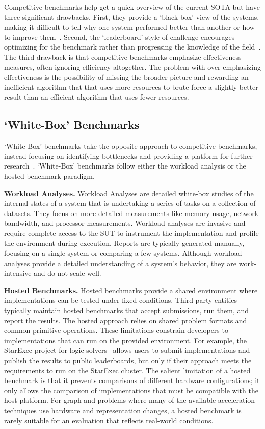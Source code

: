 Competitive benchmarks help get a quick overview of the current \ac{SOTA} but have three significant drawbacks. 
First, they provide a `black box' view of the systems, making it difficult to tell why one system performed better than another or how to improve them~\cite{Saavedra1996, Hooker1994}.
Second, the `leaderboard' style of challenge encourages optimizing for the benchmark rather than progressing the knowledge of the field~\cite{Hooker1995}. 
The third drawback is that competitive benchmarks emphasize effectiveness measures, often ignoring efficiency altogether.
The problem with over-emphasizing effectiveness is the possibility of missing the broader picture and rewarding an inefficient algorithm that that uses more resources to brute-force a slightly better result than an efficient algorithm that uses fewer resources.

\subsection{`White-Box' Benchmarks}
`White-Box' benchmarks take the opposite approach to competitive benchmarks, instead focusing on identifying bottlenecks and providing a platform for further research~\cite{Hooker1994, Hooker1995}.
`White-Box' benchmarks follow either the workload analysis or the hosted benchmark paradigm.

\textbf{Workload Analyses.}
Workload Analyses are detailed white-box studies of the internal states of a system that is undertaking a series of tasks on a collection of datasets.
They focus on more detailed measurements like memory usage, network bandwidth, and processor measurements.
Workload analyses are invasive and require complete access to the \ac{SUT} to instrument the implementation and profile the environment during execution.
Reports are typically generated manually, focusing on a single system or comparing a few systems. 
Although workload analyses provide a detailed understanding of a system's behavior, they are work-intensive and do not scale well.

\textbf{Hosted Benchmarks.}
Hosted benchmarks provide a shared environment where implementations can be tested under fixed conditions.
Third-party entities typically maintain hosted benchmarks that accept submissions, run them, and report the results. 
The hosted approach relies on shared problem formats and common primitive operations. 
These limitations constrain developers to implementations that can run on the provided environment. 
For example, the StarExec project for logic solvers~\cite{Stump2014} allows users to submit implementations and publish the results to public leaderboards, but only if their approach meets the requirements to run on the StarExec cluster.
The salient limitation of a hosted benchmark is that it prevents comparisons of different hardware configurations; it only allows the comparison of implementations that must be compatible with the host platform.
For graph and \gai problems where many of the available acceleration techniques use hardware and representation changes, a hosted benchmark is rarely suitable for an evaluation that reflects real-world conditions.

